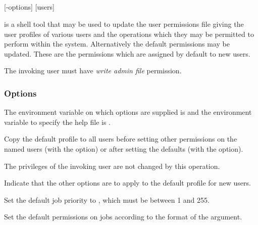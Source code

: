 \subsection{\BtuchangeName}

\begin{expara}

\BtuchangeName{} [-options] [users]

\end{expara}

\PrBtuchange{} is a shell tool that may be used to update the user permissions file giving the user profiles of various
users and the operations which they may be permitted to perform within the \ProductName{} system. Alternatively the
{\textquotedbl}default permissions{\textquotedbl} may be updated. These are the permissions which are assigned by default to new
\ProductName{} users.

The invoking user must have \textit{write admin file} permission.

\subsubsection{Options}
The environment variable on which options are supplied is \filename{\BtuchangeVarname} and the environment variable to specify
the help file is .

\explainopt


Copy the default profile to all users before setting other permissions on the named users (with the 
option) or after setting the defaults (with the  option).

The privileges of the invoking user are not changed by this operation.


Indicate that the other options are to apply to the default profile for new users.


Set the default job priority to , which must be between 1 and 255.


Set the default permissions on jobs according to the format of the  argument.


